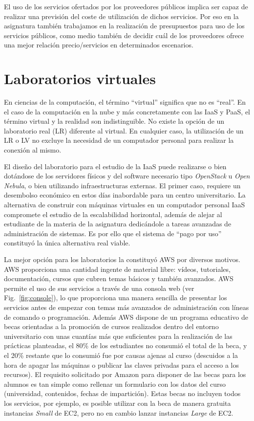 \documentclass[conference]{IEEEtran}
\begin{document}
El uso de los servicios ofertados por los
proveedores públicos implica ser capaz de realizar una previsión del coste de
utilización de dichos servicios. Por eso en la asignatura también trabajamos en la
realización de presupuestos para uso de los servicios públicos, como medio
también de decidir cuál de los proveedores ofrece una mejor relación
precio/servicios en determinados escenarios.



\section{Laboratorios virtuales \label{sec:laboratorios_virtuales}}

En ciencias de la computación, el término ``virtual'' significa que no es ``real''.
En el caso de la computación en la nube y más concretamente con las IaaS y PaaS, el término virtual y la realidad son indistinguible.
No existe la opción de un laboratorio real (LR) diferente al virtual. En cualquier caso, la utilización de un LR o LV no excluye la necesidad de un computador personal para realizar la conexión al mismo.

El diseño del laboratorio para el estudio de la IaaS  puede realizarse
o bien dotándose de los servidores físicos y del software necesario tipo \textit{OpenStack} \cite{Pepple:2011} u \textit{Open Nebula}, o bien utilizando infraestructuras externas.
El primer caso, requiere un desembolso económico en estos días inabordable para un centro universitario.
La alternativa de construir con máquinas virtuales en un computador personal IaaS compromete el estudio de la escalabilidad horizontal,
además de  alejar al estudiante de la materia de la asignatura dedicándole a tareas avanzadas de administración de sistemas.
Es por ello que el sistema de ``pago por uso'' constituyó la única alternativa real viable.

La mejor opción para los laboratorios la constituyó AWS por diversos motivos.
AWS proporciona una cantidad ingente de material libre: vídeos, tutoriales, documentación, cursos que cubren temas básicos y también avanzados.
AWS permite el uso de sus servicios a través de una consola web (ver Fig.~\ref{fig:console}), lo que proporciona una  manera sencilla de presentar
los servicios antes de empezar con temas más avanzados de administración con líneas de comando o programación.
Además AWS dispone de un programa educativo de becas orientadas a la promoción de cursos realizados dentro del entorno universitario con unas cuantías más que suficientes
para la realización de las prácticas planteadas, el 80\% de los estudiantes no consumió el total de la beca, y el 20\% restante que lo consumió fue por causas ajenas al curso
(descuidos a la hora de apagar las máquinas o publicar las claves privadas para el acceso a los recursos).
El requisito solicitado por Amazon para disponer de las becas para los alumnos es tan simple como rellenar un formulario con los datos del curso (universidad, contenidos, fechas de impartición).
Estas becas no incluyen todos los servicios, por ejemplo, es posible utilizar con la beca de manera gratuita instancias \textit{Small} de EC2, pero no en cambio lanzar instancias \textit{Large} de EC2.
\end{document}
